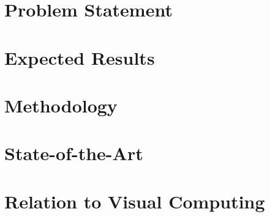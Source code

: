 \documentclass[a4paper,11pt,twoside]{memoir}
\begin{document}

%


%


%


%


%


%


%


%

%

\section{Problem Statement}
\section{Expected Results}
\section{Methodology}
\section{State-of-the-Art}
\section{Relation to Visual Computing}

\backmatter



\end{document}
